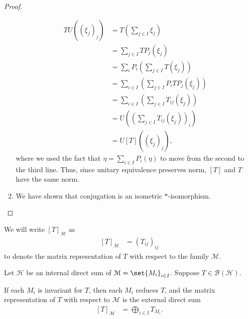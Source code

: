 \documentclass[10pt]{mypackage}
\begin{document}
\begin{proof}
\begin{enumerate}[(1)]
      \begin{align*}
        TU\left(\left(\xi_j\right)_j\right) &= T\left(\sum_{j\in I}\xi_j\right)\\
                                            &= \sum_{j\in I}TP_j\left(\xi_j\right)\\
                                            &= \sum_{i}P_i\left(\sum_{j\in I}T\left(\xi_j\right)\right)\\
                                            &= \sum_{i\in I}\left(\sum_{j\in I}P_iTP_j\left(\xi_j\right)\right)\\
                                            &= \sum_{i\in I}\left(\sum_{j\in I}T_{ij}\left(\xi_j\right)\right)\\
                                            &= U\left(\left(\sum_{j\in I}T_{ij}\left(\xi_j\right)\right)_i\right)\\
                                            &= U\left[T\right]\left(\left(\xi_j\right)_j\right),
      \end{align*}
      where we used the fact that $\eta = \sum_{i\in I}P_i\left(\eta\right)$ to move from the second to the third line. Thus, since unitary equivalence preserves norm, $\left[T\right]$ and $T$ have the same norm.
    \item We have shown that conjugation is an isometric $\ast$-isomorphism.
  \end{enumerate}
\end{proof}
\begin{remark}
  We will write $\left[T\right]_{\mathcal{M}}$ as
  \begin{align*}
    \left[T\right]_{\mathcal{M}} &= \left(T_{ij}\right)_{ij}
  \end{align*}
  to denote the matrix representation of $T$ with respect to the family $\mathcal{M}$.
\end{remark}
\begin{proposition}
  Let $\mathcal{H}$ be an internal direct sum of $\mathcal{M} = \set{M_{i}}_{i\in I}$. Suppose $T\in \mathcal{B}\left(\mathcal{H}\right)$.\newline

  If each $M_i$ is invariant for $T$, then each $M_i$ reduces $T$, and the matrix representation of $T$ with respect to $\mathcal{M}$ is the external direct sum
  \begin{align*}
    \left[T\right]_{\mathcal{M}} &= \bigoplus_{i\in I}T_{M_i}.
  \end{align*}
\end{proposition}
\end{document}
